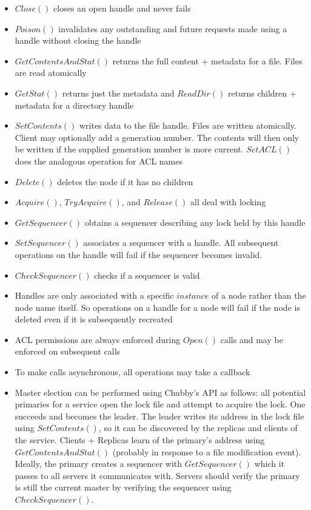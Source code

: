 \documentclass[a4paper]{article}
\begin{document}
\begin{itemize}
\begin{itemize}
\item $Close()$ closes an open handle and never fails

\item $Poison()$ invalidates any outstanding and future requests made using a handle without closing the handle

\item $GetContentsAndStat()$ returns the full content + metadata for a file. Files are read atomically

\item $GetStat()$ returns just the metadata and $ReadDir()$ returns children + metadata for a directory handle

\item $SetContents()$ writes data to the file handle. Files are written atomically. Client may optionally add a generation number. The contents will then only be written if the supplied generation number is more current. $SetACL()$ does the analogous operation for ACL names

\item $Delete()$ deletes the node if it has no children

\item $Acquire()$, $TryAcquire()$, and $Release()$ all deal with locking

\item $GetSequencer()$ obtains a sequencer describing any lock held by this handle

\item $SetSequencer()$ associates a sequencer with a handle. All subsequent operations on the handle will fail if the sequencer becomes invalid.

\item $CheckSequencer()$ checks if a sequencer is valid

\item Handles are only associated with a specific $instance$ of a node rather than the node name itself. So operations on a handle for a node will fail if the node is deleted even if it is subsequently recreated

\item ACL permissions are always enforced during $Open()$ calls and may be enforced on subsequent calls

\item To make calls asynchronous, all operations may take a callback

\item Master election can be performed using Chubby's API as follows: all potential primaries for a service open the lock file and attempt to acquire the lock. One succeeds and becomes the leader. The leader writes its address in the lock file using $SetContents()$, so it can be discovered by the replicas and clients of the service. Clients + Replicas learn of the primary's address using $GetContentsAndStat()$ (probably in response to a file modification event). Ideally, the primary creates a sequencer with $GetSequencer()$ which it passes to all servers it communicates with. Servers should verify the primary is still the current master by verifying the sequencer using $CheckSequencer()$.
\end{itemize}


\end{itemize}
\end{document}
